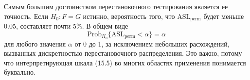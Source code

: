 Самым большим достоинством перестановочного тестирования является ее точность. Если $H_0: F = G$ истинно, вероятность того, что $\text{ASL}_\text{perm}$ будет меньше 0.05, составляет почти 5\%. В общем виде
\begin{equation}
	\text{Prob}_{H_0} \{ \text{ASL}_\text{perm} < \alpha \} = \alpha
\end{equation}
для любого значения $\alpha$ от 0 до 1, за исключением небольших расхождений, вызванных дискретностью перестановочного распределения. Это важно, потому что интерпретирующая шкала (15.5) во многих областях применения понимается буквально.